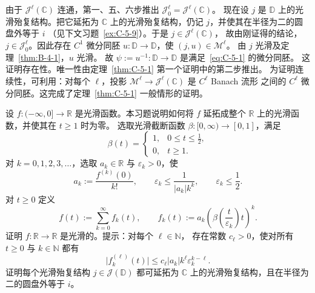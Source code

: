 由于 $\mathcal J^\ell(\mathbb C)$ 连通，第一、五、六步推出
$\mathcal J^\ell_0=\mathcal J^\ell(\mathbb C)$。
现在设 $j$ 是 $\mathbb D$ 上的光滑殆复结构。把它延拓为
$\mathbb C$ 上的光滑殆复结构，仍记 $j$，并使其在半径为二的圆盘外等于 $i$
（见下文习题~\ref{ex:C-5-9}）。于是 $j\in\mathcal J^\ell(\mathbb C)$，
故由刚证得的结论，$j\in\mathcal J^\ell_0$。因此存在 $C^1$ 微分同胚
$u:\mathbb D\to\mathbb D$，使 $(j,u)\in\mathcal M^\ell$。
由 $j$ 光滑及定理~\ref{thm:B-4-1}，$u$ 光滑。
故 $\psi:=u^{-1}:\mathbb D\to\mathbb D$ 是满足~\eqref{eq:C-5-1} 的微分同胚。
这证明存在性。唯一性由定理~\ref{thm:C-5-1} 第一个证明中的第二步推出。
为证明连续性，可利用：对每个 $\ell$，投影
$\mathcal M^\ell\to\mathcal J^\ell(\mathbb C)$ 是 $C^\ell$ Banach 流形
之间的 $C^\ell$ 微分同胚。这完成了定理~\ref{thm:C-5-1} 一般情形的证明。

\begin{exercise}\label{ex:C-5-9}
设 $f:(-\infty,0]\to\mathbb R$ 是光滑函数。本习题说明如何将 $f$
延拓成整个 $\mathbb R$ 上的光滑函数，并使其在 $t\ge1$ 时为零。
选取光滑截断函数 $\beta:[0,\infty)\to[0,1]$，满足
\[
  \beta(t)=
  \begin{cases}
    1,&0\le t\le\frac12,\\
    0,&t\ge1.
  \end{cases}
\]
对 $k=0,1,2,3,\ldots$，选取 $a_k\in\mathbb R$ 与 $\varepsilon_k>0$，使
\[
  a_k:=\frac{f^{(k)}(0)}{k!},\qquad
  \varepsilon_k\le\frac1{|a_k|k^k},\qquad
  \varepsilon_k\le\frac12.
\]
对 $t\ge0$ 定义
\begin{equation}\label{eq:C-5-13}
  f(t):=\sum_{k=0}^\infty f_k(t),\qquad
  f_k(t):=a_k\left(\beta\left(\frac{t}{\varepsilon_k}\right)t\right)^k.
\end{equation}
证明 $f:\mathbb R\to\mathbb R$ 是光滑的。提示：对每个 $\ell\in\mathbb N$，
存在常数 $c_\ell>0$，使对所有 $t\ge0$ 与 $k\in\mathbb N$ 都有
\begin{equation}\label{eq:C-5-14}
  \bigl|f_k^{(\ell)}(t)\bigr|
  \le c_\ell|a_k|k^\ell\varepsilon_k^{k-\ell}.
\end{equation}
证明每个光滑殆复结构 $j\in\mathcal J(\mathbb D)$ 都可延拓为
$\mathbb C$ 上的光滑殆复结构，且在半径为二的圆盘外等于 $i$。
\end{exercise}
